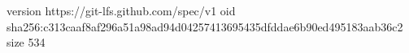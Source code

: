 version https://git-lfs.github.com/spec/v1
oid sha256:c313caaf8af296a51a98ad94d04257413695435dfddae6b90ed495183aab36c2
size 534
